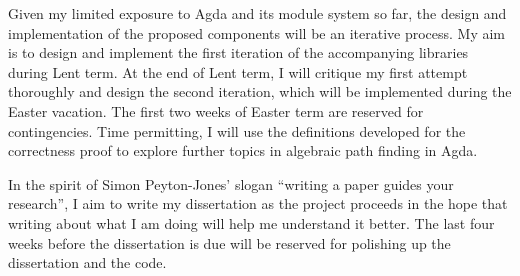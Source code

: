 \documentclass[a4paper]{scrartcl}
\begin{document}
Given my limited exposure to Agda and its module system so far, the design and implementation of the proposed components will be an iterative process. My aim is to design and implement the first iteration of the accompanying libraries during Lent term. At the end of Lent term, I will critique my first attempt thoroughly and design the second iteration, which will be implemented during the Easter vacation. The first two weeks of Easter term are reserved for contingencies. Time permitting, I will use the definitions developed for the correctness proof to explore further topics in algebraic path finding in Agda.

In the spirit of Simon Peyton-Jones' slogan \enquote{writing a paper guides your research}, I aim to write my dissertation as the project proceeds in the hope that writing about what I am doing will help me understand it better. The last four weeks before the dissertation is due will be reserved for polishing up the dissertation and the code.


\printbibliography
\end{document}
